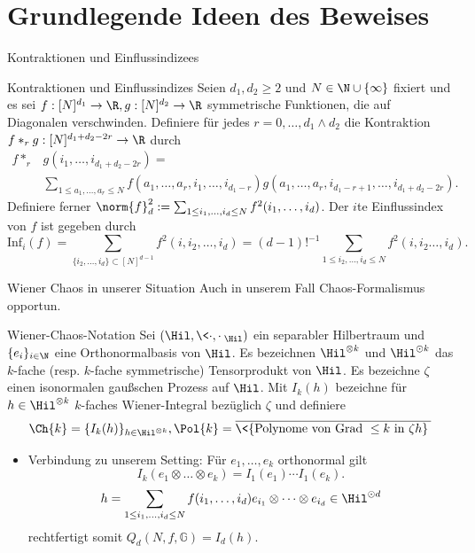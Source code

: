 \section{Grundlegende Ideen des Beweises}
\begin{frame}{Kontraktionen und Einflussindizees}
    \small
    \begin{definitionblockname}{Kontraktionen und Einflussindizes}
        Seien $d_1, d_2 \geq 2$ und $N\in \N \cup \{\infty\}$ fixiert und es sei $f: [N]^{d_1} \to \R, g: [N]^{d_2} \to \R$ symmetrische Funktionen, die auf Diagonalen verschwinden. 
        Definiere für jedes $r = 0, \ldots, d_1 \wedge d_2$ die Kontraktion $f *_r g: [N]^{d_1 + d_2 - 2r} \to \R$ durch \begin{align*}
        f *_r& g(i_1, \ldots,  i_{d_1 + d_2 - 2r}) = \\ &\sum_{1 \leq a_1, \ldots, a_r \leq N} f(a_{1}, \ldots, a_r, i_1, \ldots, i_{d_1 -r}) g(a_1, \ldots, a_r, i_{d_1 - r +1}, \ldots, i_{d_1 + d_2 - 2r}).
        \end{align*}
        Definiere ferner $\norm{f}_d^2 := \sum_{1 \leq i_1, \ldots, i_d \leq N} f^2(i_1, \ldots, i_d)$.
        \pause
        Der $i$te Einflussindex von $f$ ist gegeben durch \[
        \text{Inf}_i(f) = \sum_{\{i_2, \ldots, i_d\} \subset [N]^{d-1}} f^2(i, i_2, \ldots, i_d) = (d-1)!^{-1} \sum_{1 \leq i_2, \ldots, i_d \leq N} f^2(i, i_2 \ldots, i_d).
        \]
    \end{definitionblockname}
\end{frame}

\begin{frame}{Wiener Chaos in unserer Situation}
    \small
    Auch in unserem Fall Chaos-Formalismus opportun. 
    \begin{definitionblockname}{Wiener-Chaos-Notation}
    Sei $(\Hil, \<\cdot, \cdot\>_{\Hil})$ ein separabler Hilbertraum und $\{e_i\}_{i \in \N}$ eine Orthonormalbasis von $\Hil$. Es bezeichnen $\Hil^{\otimes k}$ und $\Hil^{\odot k}$ das $k$-fache (resp. $k$-fache symmetrische) Tensorprodukt von $\Hil$. 
    Es bezeichne $\zeta$ einen isonormalen gaußschen Prozess auf $\Hil$. 
    \pause
    Mit $I_k(h)$ bezeichne für $h \in \Hil^{\otimes k}$ $k$-faches Wiener-Integral bezüglich $\zeta$ und definiere \[\Ch{k} = \{I_k(h)\}_{h \in \Hil^{\otimes k}}, \Pol{k} = \overline{\<\{\text{Polynome von Grad } \leq k \text{ in } \zeta h\}\>}\]
    \end{definitionblockname}
    \pause
    \begin{itemize}
        \item Verbindung zu unserem Setting: Für $e_1, \ldots, e_k$ orthonormal gilt \[I_k(e_1 \otimes \ldots \otimes e_k) = I_1(e_1) \cdots I_1(e_k). 
        \]
        \pause
        \[
        h = \sum_{1 \leq i_1, \ldots, i_d \leq N} f(i_1, \ldots, i_d) e_{i_1} \otimes \cdots \otimes e_{i_d} \in \Hil^{\odot d}
        \] rechtfertigt somit $Q_d(N,f,\mathbb{G}) = I_d(h)$.
    \end{itemize}
\end{frame}

